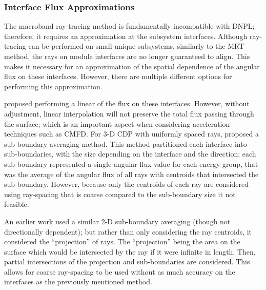 {{{        \subsubsection{Interface Flux Approximations}{\label{sssec:RT:Interface Flux Approximations}
          The macroband ray-tracing method is fundamentally incompatible with \acf{DNPL}; therefore, it requires an approximation at the subsystem interfaces.
          Although ray-tracing can be performed on small unique subsystems, similarly to the \ac{MRT} method, the rays on module interfaces are no longer guaranteed to align.
          This makes it necessary for an approximation of the spatial dependence of the angular flux on these interfaces.
          However, there are multiple different options for performing this approximation.

          \citet{Yamamoto2005} proposed performing a linear of the flux on these interfaces.
          However, without adjustment, linear interpolation will not preserve the total flux passing through the surface; which is an important aspect when considering acceleration techniques such as \ac{CMFD}.
          For 3-D \ac{CDP} with uniformly spaced rays, \citet{Liu2014} proposed a sub-boundary averaging method.
          This method partitioned each interface into sub-boundaries, with the size depending on the interface and the direction; each sub-boundary represented a single angular flux value for each energy group, that was the average of the angular flux of all rays with centroids that intersected the sub-boundary.
          However, because only the centroids of each ray are considered using ray-spacing that is coarse compared to the sub-boundary size it not feasible.

          An earlier work \cite{Hong1999} used a similar 2-D sub-boundary averaging (though not directionally dependent); but rather than only considering the ray centroids, it considered the ``projection'' of rays.
          The ``projection'' being the area on the surface which would be intersected by the ray if it were infinite in length.
          Then, partial intersections of the projection and sub-boundaries are considered.
          This allows for coarse ray-spacing to be used without as much accuracy on the interfaces as the previously mentioned method.

}}}}
